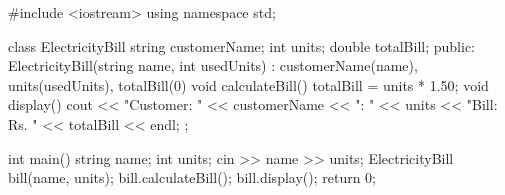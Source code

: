 
\codelabel

\begin{code}
#include <iostream>
using namespace std;

class ElectricityBill {
    string customerName; int units; double totalBill;
public:
    ElectricityBill(string name, int usedUnits) : customerName(name), units(usedUnits), totalBill(0) {}
    void calculateBill() { totalBill = units * 1.50; }
    void display() {
        cout << "Customer: " << customerName << "\nUnits: " << units << "\nTotal Bill: Rs. " << totalBill << endl;
    }
};

int main() {
    string name; int units;
    cin >> name >> units;
    ElectricityBill bill(name, units);
    bill.calculateBill(); bill.display();
    return 0;
}
\end{code}

\outputlabel
{}
